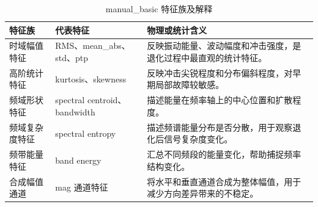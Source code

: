 \begin{table}[H]
\centering
\caption{manual\_basic 特征族及解释}
\label{tab:feature-families}
\small
\begin{tabularx}{\textwidth}{p{2.8cm}p{4.0cm}Y}
\toprule
特征族 & 代表特征 & 物理或统计含义 \\
\midrule
时域幅值特征 & RMS、mean\_abs、std、ptp & 反映振动能量、波动幅度和冲击强度，是退化过程中最直观的统计特征。 \\
高阶统计特征 & kurtosis、skewness & 反映冲击尖锐程度和分布偏斜程度，对早期局部故障较敏感。 \\
频域形状特征 & spectral centroid、bandwidth & 描述能量在频率轴上的中心位置和扩散程度。 \\
频域复杂度特征 & spectral entropy & 描述频谱能量分布是否分散，用于观察退化后信号复杂度变化。 \\
频带能量特征 & band energy & 汇总不同频段的能量变化，帮助捕捉频率结构变化。 \\
合成幅值通道 & mag 通道特征 & 将水平和垂直通道合成为整体幅值，用于减少方向差异带来的不稳定。 \\
\bottomrule
\end{tabularx}
\end{table}
